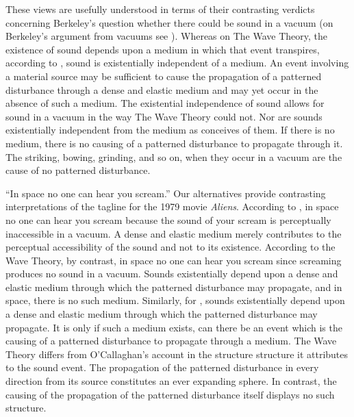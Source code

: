 
These views are usefully understood in terms of their contrasting verdicts concerning Berkeley's question whether there could be sound in a vacuum (on Berkeley's argument from vacuums see \citealt{Pasnau:1999ss}). Whereas on The Wave Theory, the existence of sound depends upon a medium in which that event transpires, according to \citet{Casati:1994aa,Casati:2014hw}, sound is existentially independent of a medium. An event involving a material source may be sufficient to cause the propagation of a patterned disturbance through a dense and elastic medium and may yet occur in the absence of such a medium. The existential independence of sound allows for sound in a vacuum in the way The Wave Theory could not. Nor are sounds existentially independent from the medium as \citet{OCallaghan:2007xy,OCallaghan:2009aa} conceives of them. If there is no medium, there is no causing of a patterned disturbance to propagate through it. The striking, bowing, grinding, and so on, when they occur in a vacuum are the cause of no patterned disturbance.

``In space no one can hear you scream.'' Our alternatives provide contrasting interpretations of the tagline for the 1979 movie \emph{Aliens}. According to \citet{Casati:1994aa,Casati:2014hw}, in space no one can hear you scream because the sound of your scream is perceptually inaccessible in a vacuum. A dense and elastic medium merely contributes to the perceptual accessibility of the sound and not to its existence. According to the Wave Theory, by contrast, in space no one can hear you scream since screaming produces no sound in a vacuum. Sounds existentially depend upon a dense and elastic medium through which the patterned disturbance may propagate, and in space, there is no such medium. Similarly, for \citet{OCallaghan:2007xy,OCallaghan:2009aa}, sounds existentially depend upon a dense and elastic medium through which the patterned disturbance may propagate. It is only if such a medium exists, can there be an event which is the causing of a patterned disturbance to propagate through a medium. The Wave Theory differs from O'Callaghan's account in the structure structure it attributes to the sound event. The propagation of the patterned disturbance in every direction from its source constitutes an ever expanding sphere. In contrast, the causing of the propagation of the patterned disturbance itself displays no such structure.

